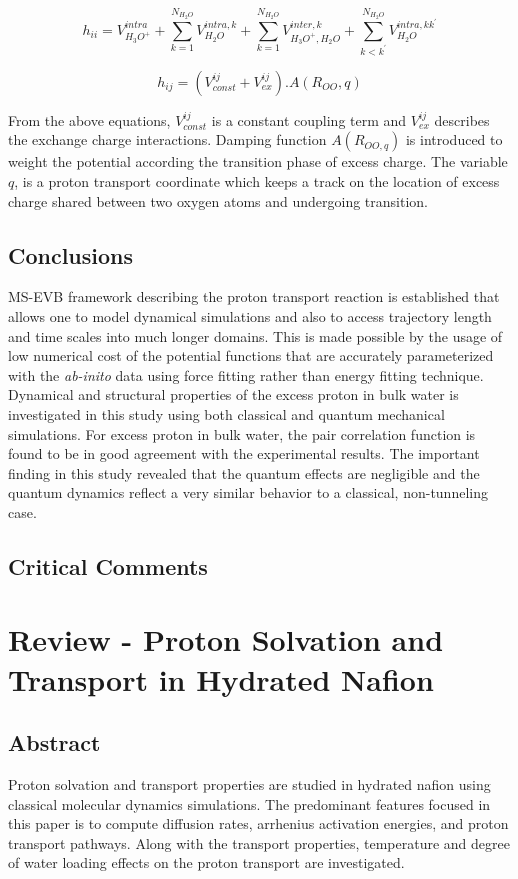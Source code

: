 \documentclass{article}
\begin{document}
$$h_{ii} = V_{H_{3}O^{+}}^{intra} + \sum_{k=1}^{N_{H_{2}O}} V_{H_{2}O}^{intra, k} + \sum_{k=1}^{N_{H_{2}O}} V_{H_{3}O^{+}, H_{2}O}^{inter, k} + \sum_{k<k^{'}}^{N_{H_{2}O}} V_{H_{2}O}^{intra, kk^{'}} $$

$$h_{ij} = (V_{const}^{ij} + V_{ex}^{ij}). A(R_{OO},q) $$

From the above equations, $V_{const}^{ij}$ is a constant coupling term and $V_{ex}^{ij}$ describes the exchange charge interactions. Damping function $A(R_{OO,q})$ is introduced to weight the potential according the transition phase of excess charge. The variable $q$, is a proton transport coordinate which keeps a track on the location of excess charge shared between two oxygen atoms and undergoing transition. 

\subsection{Conclusions}
\label{sec-2-3}
MS-EVB framework describing the proton transport reaction is established that allows one to model dynamical simulations and also to access trajectory length and time scales into much longer domains. This is made possible by the usage of low numerical cost of the potential functions that are accurately parameterized with the \emph{ab-inito} data using force fitting rather than energy fitting technique. Dynamical and structural properties of the excess proton in bulk water is investigated in this study using both classical and quantum mechanical simulations. For excess proton in bulk water, the pair correlation function is found to be in good agreement with the experimental results. The important finding in this study revealed that the quantum effects are negligible and the quantum dynamics reflect a very similar behavior to a classical, non-tunneling case.

\subsection{Critical Comments}
\label{sec-2-4}

\section{Review - Proton Solvation and Transport in Hydrated Nafion}
\label{sec-3}
\subsection{Abstract}
\label{sec-3-1}
Proton solvation and transport properties are studied in hydrated nafion using classical molecular dynamics simulations. The predominant features focused in this paper is to compute diffusion rates, arrhenius activation energies, and proton transport pathways. Along with the transport properties, temperature and degree of water loading effects on the proton transport are investigated. 
\end{document}

